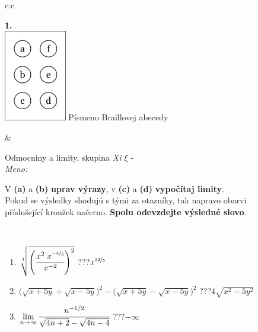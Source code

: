 \documentclass[10pt]{report}
\begin{document}
\begin{tabular}{c:c}
\begin{minipage}[c][104.5mm][t]{0.5\linewidth}
\begin{center}
\begin{minipage}{0.20\linewidth}
\begin{center}
{\Huge\bfseries 1.} \\[2mm]
\includegraphics[height=40mm]{../images/braille.png}
{\small Písmeno Braillovej abecedy}
\end{center}
\end{minipage}
\end{center}
\end{minipage}
&
\begin{minipage}[c][104.5mm][t]{0.5\linewidth}
\begin{center}
\vspace{7mm}
{\huge Odmocniny a limity, skupina \textit{Xi $\xi$} -}\\[5mm]
\textit{Meno:}\phantom{xxxxxxxxxxxxxxxxxxxxxxxxxxxxxxxxxxxxxxxxxxxxxxxxxxxxxxxxxxxxxxxxx}\\[5mm]
\begin{minipage}{0.95\linewidth}
\begin{center}
V \textbf{(a)} a \textbf{(b)} \textbf{uprav výrazy}, v \textbf{(c)} a \textbf{(d)} \textbf{vypočítaj limity}.\\Pokud se výsledky shodujú s tými za otazníky, tak napravo obarvi\\příslušející kroužek načerno. \textbf{Spolu odevzdejte výsledné slovo}.
\end{center}
\end{minipage}
\\[1mm]
\begin{minipage}{0.79\linewidth}
\begin{center}
\begin{varwidth}{\linewidth}
\begin{enumerate}
\small
\item $\sqrt[1]{\left(\cfrac{x^{2}\;x^{\nicefrac{-4}{5}}}{x^{-2}}\right)^{2}}$\quad \dotfill\; ???\;\dotfill \quad $x^{\nicefrac{32}{5}}$
\item {\footnotesize{\scriptsize$\big(\sqrt{x+5y}+\sqrt{x-5y}\big)^2-\big(\sqrt{x+5y}-\sqrt{x-5y}\big)^2$}\quad \dotfill\; ???\;\dotfill \quad $4\sqrt{x^2-5y^2}$}
\item $\lim\limits_{n\to\infty}\cfrac{n^{-1/2}}{\sqrt{4n+2}-\sqrt{4n-4}}$\quad \dotfill\; ???\;\dotfill \quad $-\infty$

\end{enumerate}
\end{varwidth}
\end{center}
\end{minipage}
\end{center}
\end{minipage}
\end{tabular}
\end{document}
